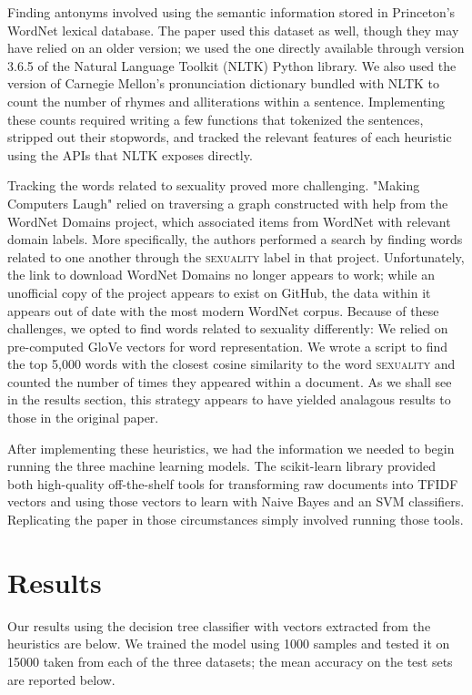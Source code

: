 \documentclass[11pt,a4paper]{article}
\begin{document}
Finding antonyms involved using the semantic information stored in Princeton's WordNet lexical database. The paper used this dataset as well, though they may have relied on an older version; we used the one directly available through version 3.6.5 of the Natural Language Toolkit (NLTK) Python library. \cite{10.5555/1717171} We also used the version of Carnegie Mellon's pronunciation dictionary bundled with NLTK to count the number of rhymes and alliterations within a sentence. Implementing these counts required writing a few functions that tokenized the sentences, stripped out their stopwords, and tracked the relevant features of each heuristic using the APIs that NLTK exposes directly.

Tracking the words related to sexuality proved more challenging. "Making Computers Laugh" relied on traversing a graph constructed with help from the WordNet Domains project, which associated items from WordNet with relevant domain labels. More specifically, the authors performed a search by finding words related to one another through the \textsc{sexuality} label in that project. Unfortunately, the link to download WordNet Domains no longer appears to work; while an unofficial copy of the project appears to exist on GitHub, the data within it appears out of date with the most modern WordNet corpus. Because of these challenges, we opted to find words related to sexuality differently: We relied on pre-computed GloVe vectors for word representation. \cite{pennington-etal-2014-glove} We wrote a script to find the top 5,000 words with the closest cosine similarity to the word \textsc{sexuality} and counted the number of times they appeared within a document. As we shall see in the results section, this strategy appears to have yielded analagous results to those in the original paper.

After implementing these heuristics, we had the information we needed to begin running the three machine learning models. The scikit-learn library provided both high-quality off-the-shelf tools for transforming raw documents into TFIDF vectors and using those vectors to learn with Naive Bayes and an SVM classifiers. \cite{sklearn_api} Replicating the paper in those circumstances simply involved running those tools.

\section{Results}

Our results using the decision tree classifier with vectors extracted from the heuristics are below. We trained the model using 1000 samples and tested it on 15000 taken from each of the three datasets; the mean accuracy on the test sets are reported below.
\end{document}
